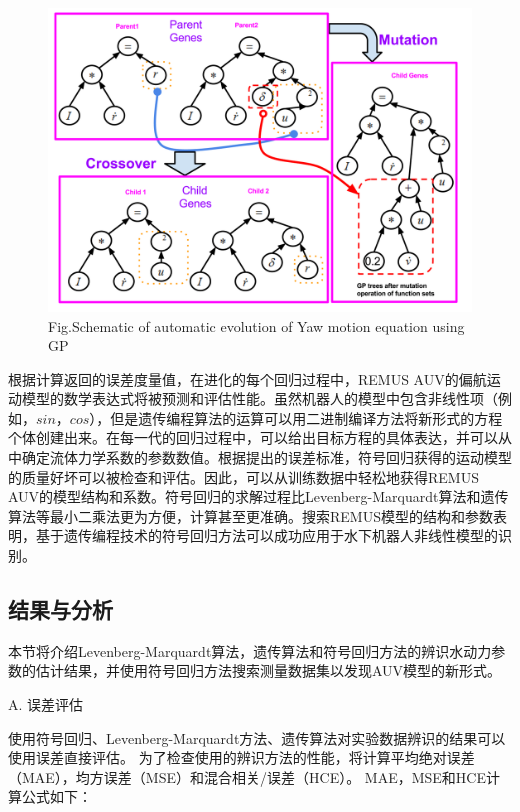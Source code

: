 \begin{figure}[!htp]
\centering
\includegraphics[width=14cm]{figure/chap3/GPevolution.png}
\label{fig:chap3:F2}
 {Fig.}{Schematic of automatic evolution of Yaw motion equation using GP }
\end{figure}

根据计算返回的误差度量值，在进化的每个回归过程中，REMUS AUV的偏航运动模型的数学表达式将被预测和评估性能。虽然机器人的模型中包含非线性项（例如，$sin$，$cos$），但是遗传编程算法的运算可以用二进制编译方法将新形式的方程个体创建出来。在每一代的回归过程中，可以给出目标方程的具体表达，并可以从中确定流体力学系数的参数数值。根据提出的误差标准，符号回归获得的运动模型的质量好坏可以被检查和评估。因此，可以从训练数据中轻松地获得REMUS AUV的模型结构和系数。符号回归的求解过程比Levenberg-Marquardt算法和遗传算法等最小二乘法更为方便，计算甚至更准确。搜索REMUS模型的结构和参数表明，基于遗传编程技术的符号回归方法可以成功应用于水下机器人非线性模型的识别。

\subsection{结果与分析 }

本节将介绍Levenberg-Marquardt算法，遗传算法和符号回归方法的辨识水动力参数的估计结果，并使用符号回归方法搜索测量数据集以发现AUV模型的新形式。

A. 误差评估

使用符号回归、Levenberg-Marquardt方法、遗传算法对实验数据辨识的结果可以使用误差直接评估。 为了检查使用的辨识方法的性能，将计算平均绝对误差（MAE），均方误差（MSE）和混合相关/误差（HCE）。  MAE，MSE和HCE计算公式如下：

